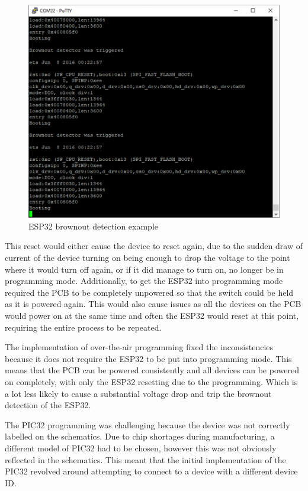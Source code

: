 \begin{figure}[!ht]
  \caption{ESP32 brownout detection example}\label{fig:brownout}
  \centering
  \includegraphics[width=\textwidth/2]{chapters/development/brownout_detection}
\end{figure}

This reset would either cause the device to reset again,
due to the sudden draw of current of the device turning on being enough to drop the voltage to the point where it would turn off again,
or if it did manage to turn on, no longer be in programming mode.
Additionally, to get the ESP32 into programming mode required the PCB to be completely unpowered
so that the switch could be held as it is powered again.
This would also cause issues as all the devices on the PCB would power on at the same time and often the ESP32 would reset at this point,
requiring the entire process to be repeated.

The implementation of over-the-air programming fixed the inconsistencies because it does not require the ESP32 to be put into programming mode.
This means that the PCB can be powered consistently and all devices can be powered on completely, with only the ESP32 resetting due to the programming.
Which is a lot less likely to cause a substantial voltage drop and trip the brownout detection of the ESP32.

The PIC32 programming was challenging because the device was not correctly labelled on the schematics.
Due to chip shortages during manufacturing, a different model of PIC32 had to be chosen, however this was not obviously reflected in the schematics.
This meant that the initial implementation of the PIC32 revolved around attempting to connect to a device with a different device ID.

